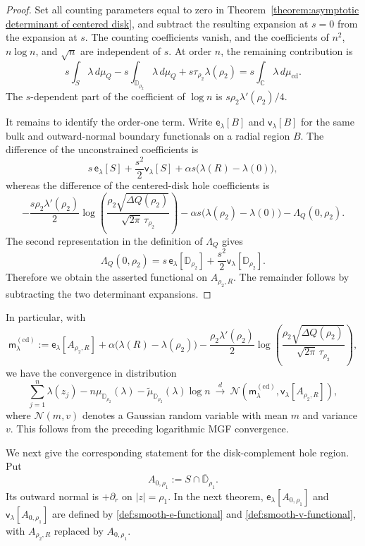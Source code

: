 \documentclass[a4paper]{article}
\newcommand{\C}{\mathbb{C}}
\numberwithin{equation}{section}
\begin{document}
\begin{proof}
Set all counting parameters equal to zero in
Theorem~\ref{theorem:asymptotic determinant of centered disk}, and subtract
the resulting expansion at $s=0$ from the expansion at $s$.  The counting
coefficients vanish, and the coefficients of $n^2$, $n\log n$, and
$\sqrt n$ are independent of $s$.  At order $n$, the remaining contribution
is
\[
s\int_S\lambda\,d\mu_Q
-s\int_{\mathbb D_{\rho_2}}\lambda\,d\mu_Q
+s\tau_{\rho_2}\lambda(\rho_2)
=s\int_{\C}\lambda\,d\mu_{\mathrm{cd}}.
\]
The $s$-dependent part of the coefficient of $\log n$ is
$s\rho_2\lambda'(\rho_2)/4$.

It remains to identify the order-one term.  Write
$\mathsf e_\lambda[B]$ and $\mathsf v_\lambda[B]$ for the same bulk and
outward-normal boundary functionals on a radial region $B$.  The difference of the
unconstrained coefficients is
\[
s\,\mathsf e_\lambda[S]
+\frac{s^2}{2}\mathsf v_\lambda[S]
+\alpha s\bigl(\lambda(R)-\lambda(0)\bigr),
\]
whereas the difference of the centered-disk hole coefficients is
\[
-\frac{s\rho_2\lambda'(\rho_2)}{2}
 \log\!\left(
 \frac{\rho_2\sqrt{\Delta Q(\rho_2)}}
 {\sqrt{2\pi}\,\tau_{\rho_2}}
 \right)
-\alpha s\bigl(\lambda(\rho_2)-\lambda(0)\bigr)
-\Lambda_Q(0,\rho_2).
\]
The second representation in the definition of $\Lambda_Q$ gives
\[
\Lambda_Q(0,\rho_2)
=s\,\mathsf e_\lambda[\mathbb D_{\rho_2}]
+\frac{s^2}{2}\mathsf v_\lambda[\mathbb D_{\rho_2}].
\]
Therefore we obtain the asserted functional on $A_{\rho_2,R}$.  
The remainder follows by subtracting the two determinant expansions.
\end{proof}

In particular, with
\[
\mathsf m_\lambda^{(\mathrm{cd})}
:=\mathsf e_\lambda[A_{\rho_2,R}]
+\alpha\bigl(\lambda(R)-\lambda(\rho_2)\bigr)
-\frac{\rho_2\lambda'(\rho_2)}{2}
\log\!\left(\frac{\rho_2\sqrt{\Delta Q(\rho_2)}}{\sqrt{2\pi}\,\tau_{\rho_2}}\right),
\]
we have the convergence in distribution
\[
\sum_{j=1}^n\lambda(z_j)
-n\mu_{\mathbb D_{\rho_2}}(\lambda)
-\widetilde\mu_{\mathbb D_{\rho_2}}(\lambda)\log n
\ \xrightarrow{\ d\ }\ 
\mathcal N\!\left(\mathsf m_\lambda^{(\mathrm{cd})},
\mathsf v_\lambda[A_{\rho_2,R}]\right),
\]
where $\mathcal{N}(m,v)$ denotes a Gaussian random variable with mean $m$ and variance $v$. 
This follows from the preceding logarithmic MGF convergence.

We next give the corresponding statement for the disk-complement hole region. Put
\[
A_{0,\rho_1}:=S\cap\overline{\mathbb D}_{\rho_1}.
\]
Its outward normal is $+\partial_r$ on $|z|=\rho_1$.  In the next theorem,
$\mathsf e_\lambda[A_{0,\rho_1}]$ and
$\mathsf v_\lambda[A_{0,\rho_1}]$ are defined by
\eqref{def:smooth-e-functional} and \eqref{def:smooth-v-functional}, with
$A_{\rho_2,R}$ replaced by $A_{0,\rho_1}$.
\end{document}
